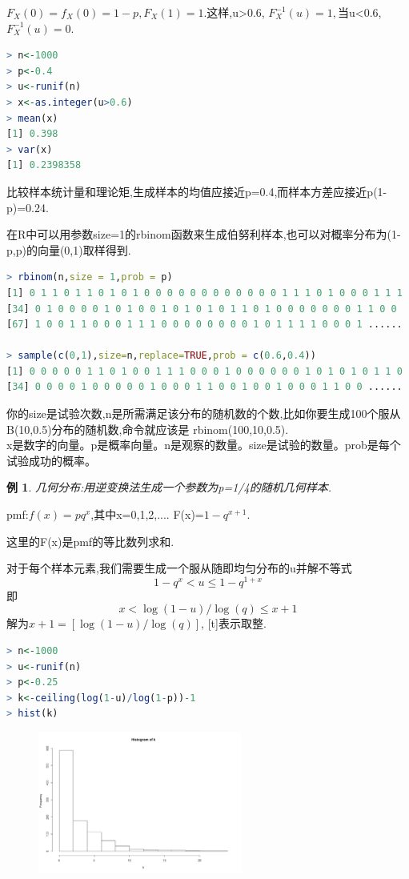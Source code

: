 \documentclass[11pt,a4paper,oneside]{book}
\newtheorem{example}{例}
\begin{document}
$ F_X(0)=f_X(0)=1-p,F_X(1)=1. $这样,u>0.6, $ F_X^{-1}(u)=1,$当u<0.6, $ F_X^{-1}(u)=0.$
\begin{lstlisting}[language=r]
> n<-1000
> p<-0.4
> u<-runif(n)
> x<-as.integer(u>0.6)
> mean(x)
[1] 0.398
> var(x)
[1] 0.2398358
\end{lstlisting}
比较样本统计量和理论矩,生成样本的均值应接近p=0.4,而样本方差应接近p(1-p)=0.24.
\begin{tcolorbox}[colback=pink!10!white,colframe=pink!100!black]
在R中可以用参数size=1的rbinom函数来生成伯努利样本,也可以对概率分布为(1-p,p)的向量(0,1)取样得到.
\begin{lstlisting}[language=r]
> rbinom(n,size = 1,prob = p)
[1] 0 1 1 0 1 1 0 1 0 1 0 0 0 0 0 0 0 0 0 0 0 0 1 1 1 0 1 0 0 0 1 1 1
[34] 0 1 0 0 0 0 1 0 1 0 0 1 0 1 0 1 0 1 1 0 1 0 0 0 0 0 0 0 1 1 0 0 
[67] 1 0 0 1 1 0 0 0 1 1 1 0 0 0 0 0 0 0 0 1 0 1 1 1 1 0 0 0 1 ......

> sample(c(0,1),size=n,replace=TRUE,prob = c(0.6,0.4))
[1] 0 0 0 0 0 1 1 0 1 0 0 1 1 1 0 0 0 1 0 0 0 0 0 0 1 0 1 0 1 0 1 1 0
[34] 0 0 0 0 1 0 0 0 0 0 1 0 0 0 1 1 0 0 1 0 0 1 0 0 0 1 1 0 0 ......
\end{lstlisting}
你的size是试验次数,n是所需满足该分布的随机数的个数,比如你要生成100个服从B(10,0.5)分布的随机数,命令就应该是 rbinom(100,10,0.5).\\

x是数字的向量。p是概率向量。n是观察的数量。size是试验的数量。prob是每个试验成功的概率。
\end{tcolorbox}

\begin{example}
几何分布:用逆变换法生成一个参数为p=1/4的随机几何样本.
\end{example}
pmf:$ f(x)=pq^x $,其中x=0,1,2,....  F(x)=$ 1-q^{x+1} $.
\begin{tcolorbox}[colback=pink!10!white,colframe=pink!100!black]
这里的F(x)是pmf的等比数列求和.
\end{tcolorbox}
对于每个样本元素,我们需要生成一个服从随即均匀分布的u并解不等式
$$ 1-q^x<u\leq1-q^{1+x} $$
即$$x<\log(1-u)/\log(q)\leq x+1$$
解为$x+1=[\log(1-u)/\log(q)]$, [t]表示取整.
\begin{lstlisting}[language=r]
> n<-1000
> u<-runif(n)
> p<-0.25
> k<-ceiling(log(1-u)/log(1-p))-1
> hist(k)
\end{lstlisting}
\begin{figure}[H]
	\centering
	\includegraphics[width=0.6\textwidth]{4.png}
\end{figure}
\end{document}
